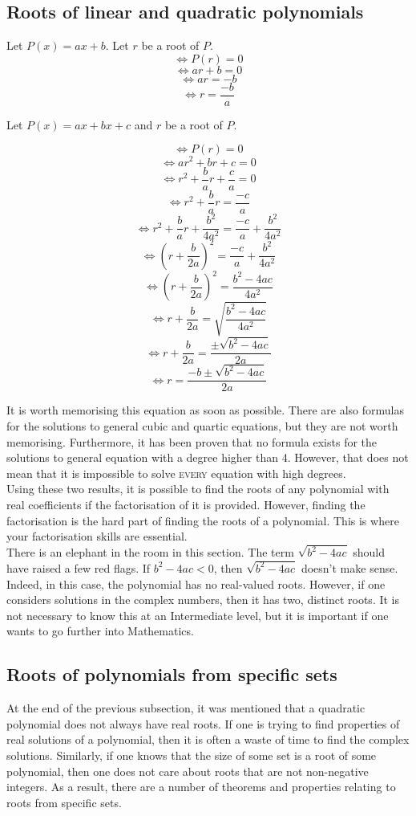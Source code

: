 \documentclass[a4paper,12pt]{article}
\begin{document}
\subsection{Roots of linear and quadratic polynomials}
Let $P(x) = ax + b$. Let $r$ be a root of $P$.
$$\iff P(r) = 0$$
$$\iff ar + b = 0$$
$$\iff ar = -b$$
$$\iff r = \frac{-b}{a}$$

Let $P(x) = ax + bx + c$ and $r$ be a root of $P$.
 
$$\iff P(r) = 0$$
$$\iff ar^2 + br + c = 0$$
$$\iff r^2 + \frac{b}{a}r + \frac{c}{a} = 0$$
$$\iff r^2 + \frac{b}{a}r = \frac{-c}{a}$$
$$\iff r^2 + \frac{b}{a}r + \frac{b^2}{4a^2} = \frac{-c}{a} + \frac{b^2}{4a^2}$$
$$\iff (r + \frac{b}{2a})^2 = \frac{-c}{a} + \frac{b^2}{4a^2}$$
$$\iff (r + \frac{b}{2a})^2 = \frac{b^2 - 4ac}{4a^2}$$
$$\iff r + \frac{b}{2a} = \sqrt{ \frac{b^2 - 4ac}{4a^2} }$$
$$\iff r + \frac{b}{2a} = \frac{\pm \sqrt{b^2 - 4ac}}{2a}$$
$$\iff r = \frac{-b \pm \sqrt{b^2 - 4ac}}{2a}$$

It is worth memorising this equation as soon as possible. There are also formulas for the solutions to general cubic and quartic equations, but they are not worth memorising. Furthermore, it has been proven that no formula exists for the solutions to general equation with a degree higher than 4. However, that does not mean that it is impossible to solve \textsc{every} equation with high degrees. \\

Using these two results, it is possible to find the roots of any polynomial with real coefficients if the factorisation of it is provided. However, finding the factorisation is the hard part of finding the roots of a polynomial. This is where your factorisation skills are essential. \\

There is an elephant in the room in this section. The term $\sqrt{b^2 - 4ac}$ should have raised a few red flags. If $b^2 - 4ac < 0$, then $\sqrt{b^2 - 4ac}$ doesn't make sense. Indeed, in this case, the polynomial has no real-valued roots. However, if one considers solutions in the complex numbers, then it has two, distinct roots. It is not necessary to know this at an Intermediate level, but it is important if one wants to go further into Mathematics.

\subsection{Roots of polynomials from specific sets}
At the end of the previous subsection, it was mentioned that a quadratic polynomial does not always have real roots. If one is trying to find properties of real solutions of a polynomial, then it is often a waste of time to find the complex solutions. Similarly, if one knows that the size of some set is a root of some polynomial, then one does not care about roots that are not non-negative integers. As a result, there are a number of theorems and properties relating to roots from specific sets. \\
\end{document}
